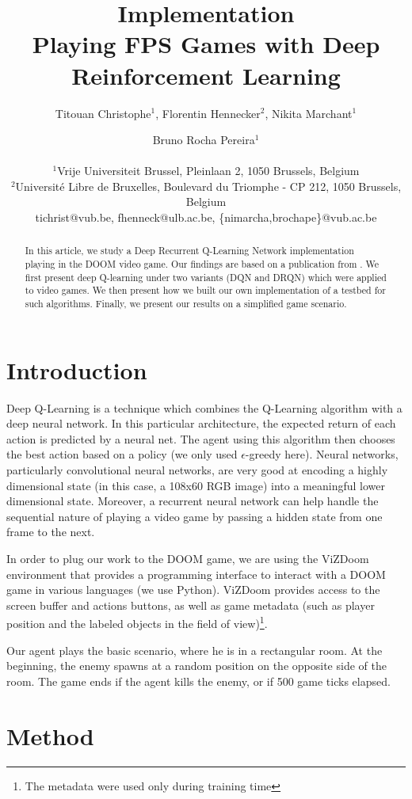 \documentclass[letterpaper]{article}
\title{Implementation\\Playing FPS Games with Deep Reinforcement Learning}
\author{Titouan Christophe$^{1}$, Florentin Hennecker$^{2}$, Nikita Marchant$^{1}$ \and Bruno Rocha Pereira$^{1}$ \\
\mbox{}\\
$^1$Vrije Universiteit Brussel, Pleinlaan 2, 1050 Brussels, Belgium \\
$^2$Universit\'e Libre de Bruxelles, Boulevard du Triomphe - CP 212, 1050
Brussels, Belgium \\
tichrist@vub.be, fhenneck@ulb.ac.be, \{nimarcha,brochape\}@vub.ac.be}
\begin{document}
\maketitle

\begin{abstract}
In this article, we study a Deep Recurrent Q-Learning Network implementation
playing in the DOOM video game. Our findings are based on a publication from
\cite{Lample2016}. We first present deep Q-learning under two variants (DQN and
DRQN) which were applied to video games. We then present how we built our own
implementation of a testbed for such algorithms. Finally, we present our results
on a simplified game scenario.
\end{abstract}

\section{Introduction}
Deep Q-Learning is a technique which combines the Q-Learning algorithm with
a deep neural network. In this particular architecture, the expected return of
each action is predicted by a neural net. The agent using this algorithm then
chooses the best action based on a policy (we only used $\epsilon$-greedy here).
Neural networks, particularly convolutional neural networks, are very good at
encoding a highly dimensional state (in this case, a 108x60 RGB image) into a
meaningful lower dimensional state. Moreover, a recurrent neural network can
help handle the sequential nature of playing a video game by passing a hidden
state from one frame to the next.

In order to plug our work to the DOOM game, we are using the ViZDoom environment
\citep{Kempka2016} that provides a programming interface to interact with a
DOOM game in various languages (we use Python). ViZDoom provides access to the
screen buffer and actions buttons, as well as game metadata (such as player
position and the labeled objects in the field of view)\footnote{The metadata
were used only during training time}.

Our agent plays the basic scenario, where he is in a rectangular room.
At the beginning, the enemy spawns at a random position on the opposite side of
the room. The game ends if the agent kills the enemy, or if 500 game ticks elapsed.

\section{Method}
\end{document}
